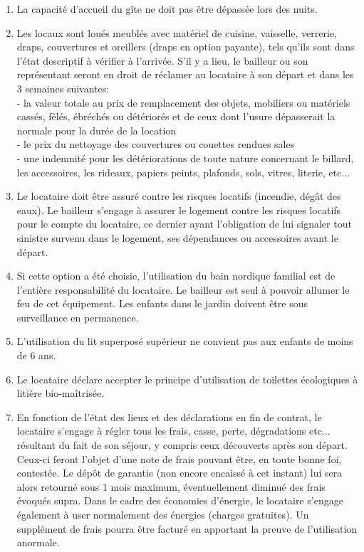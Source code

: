 \documentclass[a4paper,11pt]{article}
\begin{document}
\begin{enumerate}
\item La capacité d'accueil du gîte ne doit pas être dépassée lors des nuits.



\item Les locaux sont loués meublés avec matériel de cuisine, vaisselle, verrerie, draps, couvertures et oreillers (draps en option payante), tels qu’ils sont dans l’état descriptif à vérifier à l'arrivée.
S’il y a lieu, le bailleur ou son représentant seront en droit de réclamer au locataire à son départ et dans les 3 semaines suivantes:\\
- la valeur totale au prix de remplacement des objets, mobiliers ou matériels cassés, fêlés, ébréchés ou détériorés et de ceux dont l’usure dépasserait la normale pour la durée de la location\\
- le prix du nettoyage des couvertures ou couettes rendues sales\\
- une indemnité pour les détériorations de toute nature concernant le billard, les accessoires, les rideaux, papiers peints, plafonds, sols, vitres, literie, etc...\\



\item Le locataire doit être assuré contre les risques locatifs (incendie, dégât des eaux). 
Le bailleur s'engage à assurer le logement contre les risques locatifs pour le compte du locataire, ce dernier ayant l'obligation de lui signaler  tout sinistre survenu dans le logement, ses dépendances ou accessoires avant le départ.

\item Si cette option a été choisie, l'utilisation du bain nordique familial est de l'entière responsabilité du locataire. Le bailleur est seul à pouvoir allumer le feu de cet équipement. Les enfants dans le jardin doivent être sous surveillance en permanence. 




\item L'utilisation du lit superposé supérieur ne convient pas aux enfants de moins de 6 ans.

\item Le locataire déclare accepter le principe d'utilisation de toilettes écologiques à litière bio-maîtrisée.

\item En fonction de l’état des lieux et des déclarations en fin de contrat, le locataire s’engage à régler tous les frais, casse, perte, dégradations etc... résultant du fait de son séjour, y compris ceux découverts après son départ.
Ceux-ci feront l'objet d'une note de frais pouvant être, en toute bonne foi, contestée. 
Le dépôt de garantie (non encore encaissé à cet instant) lui sera alors retourné sous 1 mois maximum, éventuellement diminué des frais évoqués supra.
Dans le cadre des économies d’énergie, le locataire s’engage également à user normalement des énergies (charges gratuites).
Un supplément de frais pourra être facturé en apportant la preuve de l’utilisation anormale.


\end{enumerate}
\end{document}
